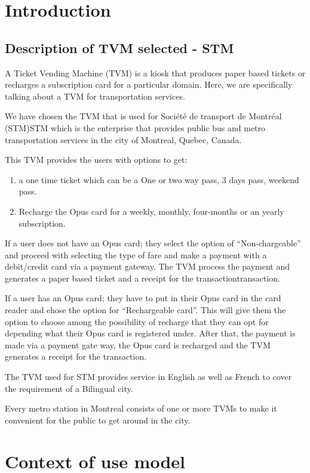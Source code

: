 \documentclass[12pt]{report}
\begin{document}
\tableofcontents
\clearpage

\chapter{Introduction}
\section{Description of TVM selected - STM}
A Ticket Vending Machine (TVM) is a kiosk that produces paper based tickets or recharges a subscription card for a particular domain. Here, we are specifically talking about a TVM for transportation services.

We have chosen the TVM that is used for Société de transport de Montréal (STM)\gls{STM} which is the enterprise that provides public bus and metro transportation services in the city of Montreal, Quebec, Canada. 

This TVM provides the users with options to get:
\begin{enumerate}
\item a one time ticket which can be a One or two way pass, 3 days pass, weekend pass.
\item Recharge the Opus card for a weekly, monthly, four-months or an yearly subscription. 
\end{enumerate}

If a user does not have an Opus card; they select the option of “Non-chargeable” and proceed with selecting the type of fare and make a payment with a debit/credit card via a payment gateway. The TVM process the payment and generates a paper based ticket and a receipt for the transaction\gls{transaction}.

If a user has an Opus card; they have to put in their Opus card in the card reader and chose the option for “Rechargeable card”. This will give them the option to choose among the possibility of recharge that they can opt for depending what their Opus card is registered under. After that, the payment is made via a payment gate way, the Opus card is recharged and the TVM generates a receipt for the transaction.  

The TVM used for STM provides service in English as well as French to cover the requirement of a Bilingual city. 
 
Every metro station in Montreal consists of one or more TVMs to make it convenient for the public to get around in the city. 




\chapter{Context of use model}
\end{document}
